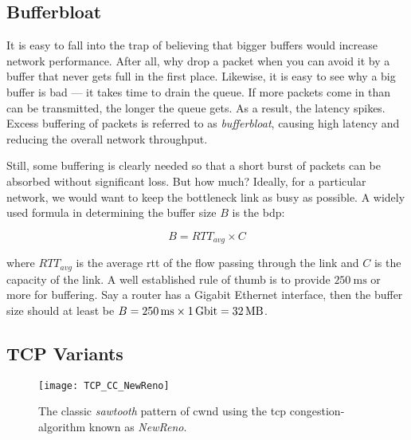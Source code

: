 \subsection{Bufferbloat}

It is easy to fall into the trap of believing that bigger buffers would increase network performance. After all, why drop a packet when you can avoid it by a buffer that never gets full in the first place. Likewise, it is easy to see why a big buffer is bad --- it takes time to drain the queue. If more packets come in than can be transmitted, the longer the queue gets. As a result, the latency spikes. Excess buffering of packets is referred to as \textit{bufferbloat}, causing high latency and reducing the overall network throughput.

Still, some buffering is clearly needed so that a short burst of packets can be absorbed without significant loss. But how much? Ideally, for a particular network, we would want to keep the bottleneck link as busy as possible. A widely used formula in determining the buffer size $B$ is the \gls{bdp}:

\begin{equation}
    B = RTT_{avg} \times C
\end{equation}

where $RTT_{avg}$ is the average \gls{rtt} of the flow passing through the link and $C$ is the capacity of the link. A well established rule of thumb is to provide $\SI{250}{\milli\second}$ or more  for buffering. \cite{sizing_router_buffers} Say a router has a Gigabit Ethernet interface, then the buffer size should at least be $B = \SI{250}{\milli\second} \times \SI{1}{\giga\bit} = \SI{32}{\mega\byte}$.




\subsection{TCP Variants}


\begin{figure}[H]
    \centering
    \texttt{[image: TCP\_CC\_NewReno]}
    \captionsetup{width=0.6\textwidth}
    \caption{The classic \textit{sawtooth} pattern of \gls{cwnd} using the \gls{tcp} congestion-algorithm known as \textit{NewReno}. }
\end{figure}








